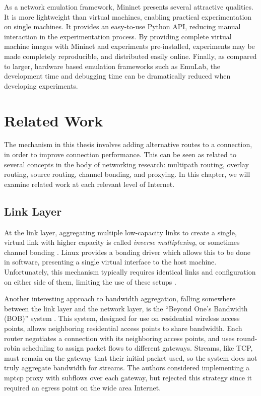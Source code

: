 \documentclass{cwru}
\begin{document}
As a network emulation framework, Mininet presents several attractive qualities.
It is more lightweight than virtual machines, enabling practical experimentation
on single machines. It provides an easy-to-use Python API, reducing manual
interaction in the experimentation process. By providing complete virtual
machine images with Mininet and experiments pre-installed, experiments may be
made completely reproducible, and distributed easily online. Finally, as
compared to larger, hardware based emulation frameworks such as EmuLab, the
development time and debugging time can be dramatically reduced when developing
experiments.

\chapter{Related Work}
\label{c:rw}

The mechanism in this thesis involves adding alternative routes to a connection,
in order to improve connection performance. This can be seen as related to
several concepts in the body of networking research: multipath routing, overlay
routing, source routing, channel bonding, and proxying. In this chapter, we will
examine related work at each relevant level of Internet.

\section{Link Layer}
\label{s:rw-ll}

At the link layer, aggregating multiple low-capacity links to create a single,
virtual link with higher capacity is called \emph{inverse multiplexing}, or
sometimes channel bonding \cite{duncanson1994inverse}. Linux provides a bonding
driver which allows this to be done in software, presenting a single virtual
interface to the host machine. Unfortunately, this mechanism typically requires
identical links and configuration on either side of them, limiting the use of
these setups \cite{chiussi1998generalized}.

Another interesting approach to bandwidth aggregation, falling somewhere between
the link layer and the network layer, is the ``Beyond One's Bandwidth (BOB)''
system \cite{radio-agg}. This system, designed for use on residential wireless
access points, allows neighboring residential access points to share bandwidth.
Each router negotiates a connection with its neighboring access points, and uses
round-robin scheduling to assign packet flows to different gateways. Streams,
like TCP, must remain on the gateway that their initial packet used, so the
system does not truly aggregate bandwidth for streams. The authors considered
implementing a \ac{mptcp} proxy with subflows over each gateway, but rejected
this strategy since it required an egress point on the wide area Internet.
\end{document}
